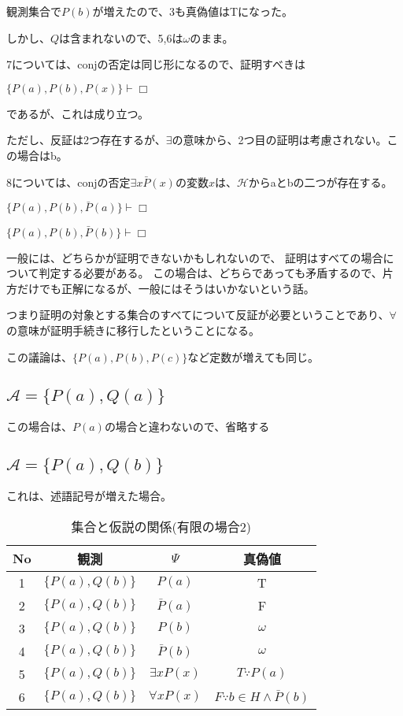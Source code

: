 \documentclass[10pt, oneside]{jarticle}   	%
\theoremstyle{definition}
\newcommand{\undet}{\omega}
\newcommand{\cont}{\Box}
\newcommand{\eset}[1]{\{{#1}\}}
\begin{document}
観測集合で$P(b)$が増えたので、3も真偽値はTになった。

しかし、$Q$は含まれないので、5,6は$\undet$のまま。

7については、conjの否定は同じ形になるので、証明すべきは

$\eset{P(a), P(b), P(x)} \vdash \cont$ 

であるが、これは成り立つ。

ただし、反証は2つ存在するが、$\exists$の意味から、2つ目の証明は考慮されない。この場合はb。

8については、conjの否定$\exists x \bar P(x)$の変数$x$は、$\mathcal{H}$からaとbの二つが存在する。

$\{P(a), P(b), \bar P(a)\} \vdash \cont$

$\{P(a), P(b), \bar P(b)\} \vdash \cont$

一般には、どちらかが証明できないかもしれないので、
証明はすべての場合について判定する必要がある。
この場合は、どちらであっても矛盾するので、片方だけでも正解になるが、一般にはそうはいかないという話。


つまり証明の対象とする集合のすべてについて反証が必要ということであり、$\forall$の意味が証明手続きに移行したということになる。

この議論は、$\eset{P(a), P(b), P(c)}$など定数が増えても同じ。
\subsection{$\mathcal{A}=\{P(a), Q(a)\}$}
この場合は、$P(a)$の場合と違わないので、省略する

\subsection{$\mathcal{A}=\eset{P(a), Q(b)}$}
これは、述語記号が増えた場合。

\begin{table}[htbp]
 \centering
 \begin{tabular}{|c|c|c|c|}\hline
   No & 観測 & $\Psi$ & 真偽値 \\ \hline
   1 & $\eset{P(a), Q(b)}$ & $P(a)$ & T \\ \hline
   2 & $\eset{P(a), Q(b)}$ & $\bar P(a)$ & F \\ \hline
   3 & $\eset{P(a), Q(b)}$ & $P(b)$ & $\undet$ \\ \hline
   4 & $\eset{P(a), Q(b)}$ & $\bar P(b)$ & $\undet$ \\ \hline
   5 & $\eset{P(a), Q(b)}$& $\exists x P(x)$ & $T \because P(a)$ \\ \hline
   6 & $\eset{P(a), Q(b)}$ & $\forall x P(x)$ & $F \because b \in H \land \bar P(b)$ \\ \hline
 \end{tabular}
 \caption{集合と仮説の関係(有限の場合2)}
 \label{tab:ex3}
\end{table}
\end{document}
